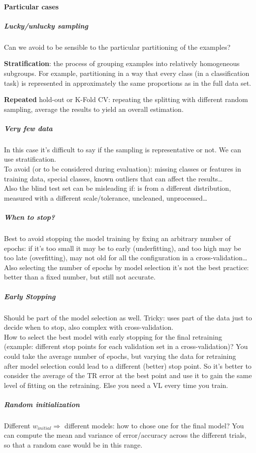 \documentclass[10pt]{report}
\begin{document}
\paragraph{Particular cases} 
\subparagraph{Lucky/unlucky sampling} Can we avoid to be sensible to the particular partitioning of the examples?
\begin{list}{}{}
	\item \textbf{Stratification}: the process of grouping examples into relatively homogeneous subgroups. For example, partitioning in a way that every class (in a classification task) is represented in approximately the same proportions as in the full data set.\\
	\item  \textbf{Repeated} hold-out or K-Fold CV: repeating the splitting with different random sampling, average the results to yield an overall estimation.
\end{list}
\subparagraph{Very few data} In this case it's difficult to say if the sampling is representative or not. We can use stratification.\\
To avoid (or to be considered during evaluation): missing classes or features in training data, special classes, known outliers that can affect the results\ldots\\
Also the blind test set can be misleading if: is from a different distribution, measured with a different scale/tolerance, uncleaned, unprocessed\ldots
\subparagraph{When to stop?} Best to avoid stopping the model training by fixing an arbitrary number of epochs: if it's too small it may be to early (underfitting), and too high may be too late (overfitting), may not old for all the configuration in a cross-validation\ldots\\
Also selecting the number of epochs by model selection it's not the best practice: better than a fixed number, but still not accurate.
\subparagraph{Early Stopping} Should be part of the model selection as well. Tricky: uses part of the data just to decide when to stop, also complex with cross-validation.\\
How to select the best model with early stopping for the final retraining (example: different stop points for each validation set in a cross-validation)? You could take the average number of epochs, but varying the data for retraining after model selection could lead to a different (better) stop point. So it's better to consider the average of the TR error at the best point and use it to gain the same level of fitting on the retraining. Else you need a VL every time you train.
\subparagraph{Random initialization} Different $w_{initial} \Rightarrow$ different models: how to chose one for the final model? You can compute the mean and variance of error/accuracy across the different trials, so that a random case would be in this range.
\end{document}
